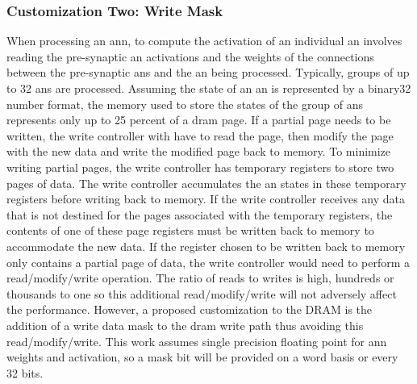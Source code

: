 \subsubsection{Customization Two: Write Mask}
\label{sec:Write Mask}
When processing an \ac{ann}, to compute the activation of an individual \ac{an} involves reading the pre-synaptic \ac{an} activations and the weights of the connections between the pre-synaptic \acp{an} and the \ac{an} being processed. 
Typically, groups of up to 32 \acp{an} are processed. Assuming the state of an \ac{an} is represented by a \ac{binary32} number format, the memory used to store the states of the group of \acp{an} represents only up to 25 percent of a \ac{dram} page.
If a partial page needs to be written, the write controller with have to read the page, then modify the page with the new data and write the modified page back to memory.
To minimize writing partial pages, the write controller has temporary registers to store two pages of data. 
The write controller accumulates the \ac{an} states in these temporary registers before writing back to memory.
If the write controller receives any data that is not destined for the pages associated with the temporary registers, the contents of one of these page registers must be written back to memory to accommodate the new data.
If the register chosen to be written back to memory only contains a partial page of data, the write controller would need to perform a read/modify/write operation.
The ratio of reads to writes is high, hundreds or thousands to one so this additional read/modify/write will not adversely affect the performance. 
However, a proposed customization to the DRAM is the addition of a write data mask to the \ac{dram} write path thus avoiding this read/modify/write.
This work assumes single precision floating point for \ac{ann} weights and activation, so a mask bit will be provided on a word basis or every 32 bits.

